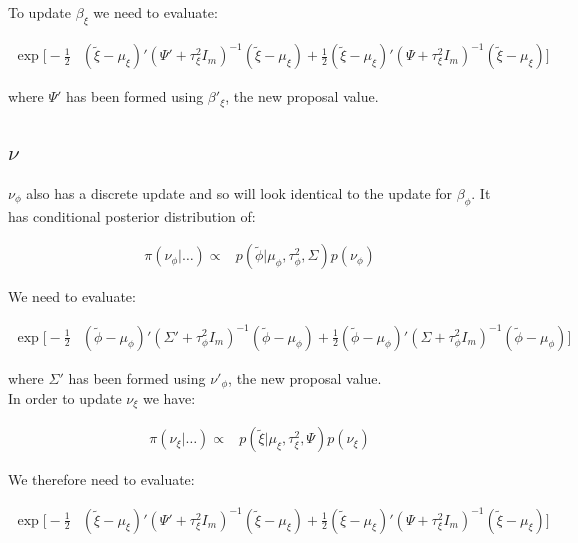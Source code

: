 \documentclass{article}
\begin{document}
To update $\beta_\xi$ we need to evaluate:

\begin{align}
\exp \Big[ -\frac{1}{2} & (\tilde{\xi} - \mu_\xi)' (\Psi' + \tau^2_\xi I_m)^{-1} (\tilde{\xi} - \mu_\xi) + \frac{1}{2} (\tilde{\xi} - \mu_\xi)' (\Psi + \tau^2_\xi I_m)^{-1} (\tilde{\xi} - \mu_\xi) \Big] \label{eq:2b2}
\end{align}

where $\Psi'$ has been formed using $\beta'_\xi$, the new proposal value. \\

\subsection{$\nu$}

$\nu_\phi$ also has a discrete update and so will look identical to the update for $\beta_\phi$. It has conditional posterior distribution of:

\begin{align*}
\pi(\nu_\phi | \dots ) \propto & p(\tilde{\phi} | \mu_\phi, \tau^2_\phi, \Sigma) p(\nu_\phi)
\end{align*}

We need to evaluate:

\begin{align}
\exp \Big[ -\frac{1}{2} & (\tilde{\phi} - \mu_\phi)' (\Sigma' + \tau^2_\phi I_m)^{-1} (\tilde{\phi} - \mu_\phi) + \frac{1}{2} (\tilde{\phi} - \mu_\phi)' (\Sigma + \tau^2_\phi I_m)^{-1} (\tilde{\phi} - \mu_\phi) \Big] \label{eq:2n1}
\end{align}

where $\Sigma'$ has been formed using $\nu'_\phi$, the new proposal value. \\

In order to update $\nu_\xi$ we have:

\begin{align*}
\pi(\nu_\xi | \dots ) \propto & p(\tilde{\xi} | \mu_\xi, \tau^2_\xi, \Psi) p(\nu_\xi)
\end{align*}

We therefore need to evaluate:

\begin{align}
\exp \Big[ -\frac{1}{2} & (\tilde{\xi} - \mu_\xi)' (\Psi' + \tau^2_\xi I_m)^{-1} (\tilde{\xi} - \mu_\xi) + \frac{1}{2} (\tilde{\xi} - \mu_\xi)' (\Psi + \tau^2_\xi I_m)^{-1} (\tilde{\xi} - \mu_\xi) \Big] \label{eq:2n2}
\end{align}
\end{document}
